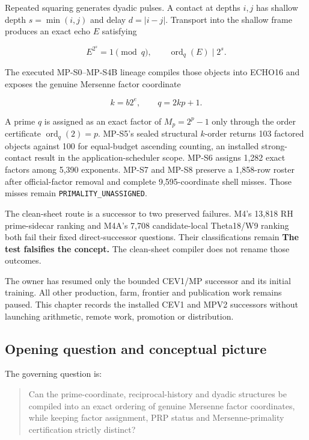 Repeated squaring generates dyadic pulses. A contact at depths \(i,j\)
has shallow depth \(s=\min(i,j)\) and delay \(d=|i-j|\). Transport into
the shallow frame produces an exact echo \(E\) satisfying

\[
E^{2^s}=1\pmod q,
\qquad
\operatorname{ord}_q(E)\mid2^s.
\]

The executed MP-S0--MP-S4B lineage compiles those objects into ECHO16
and exposes the genuine Mersenne factor coordinate

\[
k=b2^e,
\qquad
q=2kp+1.
\]

A prime \(q\) is assigned as an exact factor of \(M_p=2^p-1\) only
through the order certificate \(\operatorname{ord}_q(2)=p\). MP-S5's
sealed structural \(k\)-order returns 103 factored objects against 100
for equal-budget ascending counting, an installed strong-contact result
in the application-scheduler scope. MP-S6 assigns 1,282 exact factors
among 5,390 exponents. MP-S7 and MP-S8 preserve a 1,858-row roster after
official-factor removal and complete 9,595-coordinate shell misses.
Those misses remain \texttt{PRIMALITY\_UNASSIGNED}.

The clean-sheet route is a successor to two preserved failures. M4's
13,818 RH prime-sidecar ranking and M4A's 7,708 candidate-local
Theta18/W9 ranking both fail their fixed direct-successor questions.
Their classifications remain \textbf{The test falsifies the concept.}
The clean-sheet compiler does not rename those outcomes.

The owner has resumed only the bounded CEV1/MP successor and its initial
training. All other production, farm, frontier and publication work
remains paused. This chapter records the installed CEV1 and MPV2
successors without launching arithmetic, remote work, promotion or
distribution.

\subsection{Opening question and conceptual
picture}\label{viii-ch10-opening-question-and-conceptual-picture}

The governing question is:

\begin{quote}
Can the prime-coordinate, reciprocal-history and dyadic structures be
compiled into an exact ordering of genuine Mersenne factor coordinates,
while keeping factor assignment, PRP status and Mersenne-primality
certification strictly distinct?
\end{quote}

